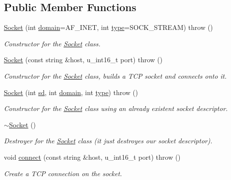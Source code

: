 \subsection*{Public Member Functions}
\begin{CompactItemize}
\item 
\hyperlink{classSocket_08ec85e71ecfde6ee952624696b3e1cb}{Socket} (int \hyperlink{classSocket_8b042d9fe02795041a5e045604c8b7ec}{domain}=AF\_\-INET, int \hyperlink{classSocket_c7f6980f36023df2004271c336217cb8}{type}=SOCK\_\-STREAM)  throw ()
\begin{CompactList}\small\item\em Constructor for the \hyperlink{classSocket}{Socket} class. \item\end{CompactList}\item 
\hyperlink{classSocket_b1d662fa225adb4d63ca40b0747496a7}{Socket} (const string \&host, u\_\-int16\_\-t port)  throw ()
\begin{CompactList}\small\item\em Constructor for the \hyperlink{classSocket}{Socket} class, builds a TCP socket and connects onto it. \item\end{CompactList}\item 
\hyperlink{classSocket_c95777f24c2c8e076ff6084ecb139884}{Socket} (int \hyperlink{classSocket_d9e40b6c9a69e0168c27962cc6c60ef7}{sd}, int \hyperlink{classSocket_8b042d9fe02795041a5e045604c8b7ec}{domain}, int \hyperlink{classSocket_c7f6980f36023df2004271c336217cb8}{type})  throw ()
\begin{CompactList}\small\item\em Constructor for the \hyperlink{classSocket}{Socket} class using an already existent socket descriptor. \item\end{CompactList}\item 
\hyperlink{classSocket_eac4eb6379a543d38ed88977d3b6630a}{$\sim$Socket} ()
\begin{CompactList}\small\item\em Destroyer for the \hyperlink{classSocket}{Socket} class (it just destroyes our socket descriptor). \item\end{CompactList}\item 
void \hyperlink{classSocket_b5a8796547ecffdbb048fd295bb8390d}{connect} (const string \&host, u\_\-int16\_\-t port)  throw ()
\begin{CompactList}\small\item\em Create a TCP connection on the socket. \item\end{CompactList}\item 

\end{CompactItemize}
